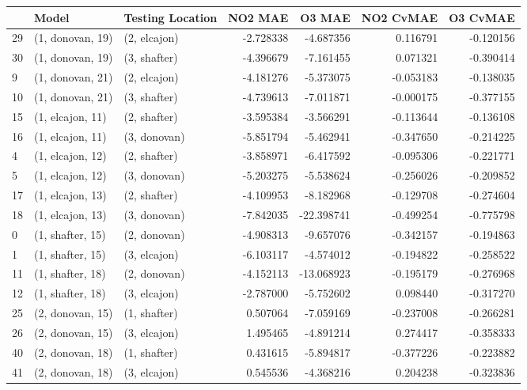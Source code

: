\begin{tabular}{lllrrrr}
\toprule
{} &             Model & Testing Location &   NO2 MAE &     O3 MAE &  NO2 CvMAE &  O3 CvMAE \\
\midrule
29 &  (1, donovan, 19) &     (2, elcajon) & -2.728338 &  -4.687356 &   0.116791 & -0.120156 \\
30 &  (1, donovan, 19) &     (3, shafter) & -4.396679 &  -7.161455 &   0.071321 & -0.390414 \\
9  &  (1, donovan, 21) &     (2, elcajon) & -4.181276 &  -5.373075 &  -0.053183 & -0.138035 \\
10 &  (1, donovan, 21) &     (3, shafter) & -4.739613 &  -7.011871 &  -0.000175 & -0.377155 \\
15 &  (1, elcajon, 11) &     (2, shafter) & -3.595384 &  -3.566291 &  -0.113644 & -0.136108 \\
16 &  (1, elcajon, 11) &     (3, donovan) & -5.851794 &  -5.462941 &  -0.347650 & -0.214225 \\
4  &  (1, elcajon, 12) &     (2, shafter) & -3.858971 &  -6.417592 &  -0.095306 & -0.221771 \\
5  &  (1, elcajon, 12) &     (3, donovan) & -5.203275 &  -5.538624 &  -0.256026 & -0.209852 \\
17 &  (1, elcajon, 13) &     (2, shafter) & -4.109953 &  -8.182968 &  -0.129708 & -0.274604 \\
18 &  (1, elcajon, 13) &     (3, donovan) & -7.842035 & -22.398741 &  -0.499254 & -0.775798 \\
0  &  (1, shafter, 15) &     (2, donovan) & -4.908313 &  -9.657076 &  -0.342157 & -0.194863 \\
1  &  (1, shafter, 15) &     (3, elcajon) & -6.103117 &  -4.574012 &  -0.194822 & -0.258522 \\
11 &  (1, shafter, 18) &     (2, donovan) & -4.152113 & -13.068923 &  -0.195179 & -0.276968 \\
12 &  (1, shafter, 18) &     (3, elcajon) & -2.787000 &  -5.752602 &   0.098440 & -0.317270 \\
25 &  (2, donovan, 15) &     (1, shafter) &  0.507064 &  -7.059169 &  -0.237008 & -0.266281 \\
26 &  (2, donovan, 15) &     (3, elcajon) &  1.495465 &  -4.891214 &   0.274417 & -0.358333 \\
40 &  (2, donovan, 18) &     (1, shafter) &  0.431615 &  -5.894817 &  -0.377226 & -0.223882 \\
41 &  (2, donovan, 18) &     (3, elcajon) &  0.545536 &  -4.368216 &   0.204238 & -0.323836 \\

\end{tabular}
